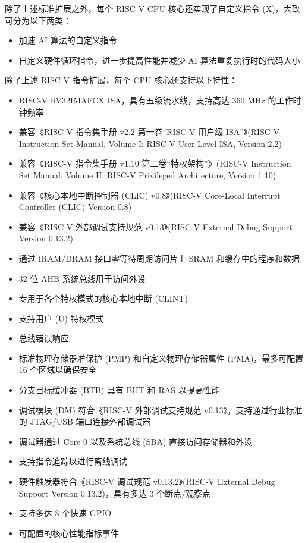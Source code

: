 \documentclass[main\_\_CN.tex]{subfiles}
\begin{document}
除了上述标准扩展之外，每个 RISC-V CPU 核心还实现了自定义指令 (X)，大致可分为以下两类：
\begin{itemize}
    \item 加速 AI 算法的自定义指令
    \item 自定义硬件循环指令，进一步提高性能并减少 AI 算法重复执行时的代码大小
\end{itemize}

除了上述 RISC-V 指令扩展，每个 CPU 核心还支持以下特性：
\begin{itemize}
    \item RISC-V RV32IMAFCX ISA，具有五级流水线，支持高达 360 MHz 的工作时钟频率
    \item 兼容《RISC-V 指令集手册 v2.2 第一卷“RISC-V 用户级 ISA”》(RISC-V Instruction Set Manual, Volume I: RISC-V User-Level ISA, Version 2.2)
    \item 兼容《RISC-V 指令集手册 v1.10 第二卷“特权架构”》(RISC-V Instruction Set Manual, Volume II: RISC-V Privileged Architecture, Version 1.10)
    \item 兼容《核心本地中断控制器 (CLIC) v0.8》(RISC-V Core-Local Interrupt Controller (CLIC) Version 0.8)
    \item 兼容《RISC-V 外部调试支持规范 v0.13》(RISC-V External Debug Support Version 0.13.2)
    \item 通过 IRAM/DRAM 接口零等待周期访问片上 SRAM 和缓存中的程序和数据
    \item 32 位 AHB 系统总线用于访问外设
    \item 专用于各个特权模式的核心本地中断 (CLINT)
    \item 支持用户 (U) 特权模式
    \item 总线错误响应
    \item 标准物理存储器准保护 (PMP) 和自定义物理存储器属性 (PMA)，最多可配置 16 个区域以确保安全
    \item 分支目标缓冲器 (BTB) 具有 BHT 和 RAS 以提高性能
    \item 调试模块 (DM) 符合《RISC-V 外部调试支持规范 v0.13》，支持通过行业标准的 JTAG/USB 端口连接外部调试器
    \item 调试器通过 Core 0 以及系统总线 (SBA) 直接访问存储器和外设
    \item 支持指令追踪以进行离线调试
    \item 硬件触发器符合《RISC-V 调试规范 v0.13.2》(RISC-V External Debug Support Version 0.13.2)，具有多达 3 个断点/观察点
    \item 支持多达 8 个快速 GPIO
    \item 可配置的核心性能指标事件

\end{itemize}
\end{document}

